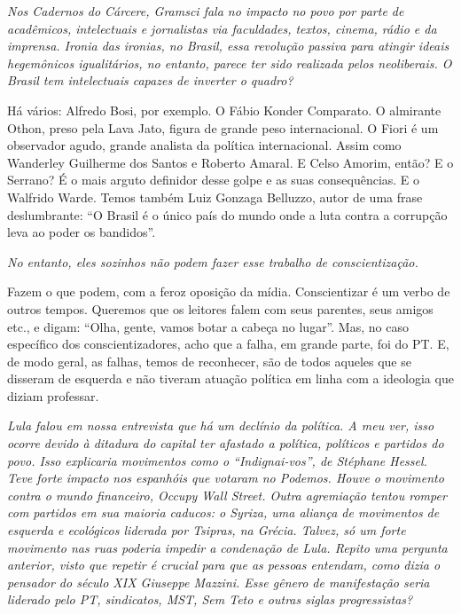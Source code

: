\itshape
 Nos \emph{Cadernos do Cárcere}, Gramsci fala no impacto
no povo por parte de acadêmicos, intelectuais e jornalistas via
faculdades, textos, cinema, rádio e da imprensa. Ironia das ironias, no
Brasil, essa revolução passiva para atingir ideais hegemônicos
igualitários, no entanto, parece ter sido realizada pelos neoliberais. O
Brasil tem intelectuais capazes de inverter o quadro?

\normalfont 
Há vários: Alfredo Bosi, por exemplo. O Fábio Konder
Comparato. O almirante Othon, preso pela Lava Jato, figura de grande
peso internacional. O Fiori é um observador agudo, grande analista da
política internacional. Assim como Wanderley Guilherme dos Santos e
Roberto Amaral. E Celso Amorim, então? E o Serrano? É o mais arguto
definidor desse golpe e as suas consequências. E o Walfrido Warde. Temos
também Luiz Gonzaga Belluzzo, autor de uma frase deslumbrante: ``O
Brasil é o único país do mundo onde a luta contra a corrupção leva ao
poder os bandidos''.

\itshape
 No entanto, eles sozinhos não podem fazer esse trabalho
de conscientização.

\normalfont 
Fazem o que podem, com a feroz oposição da mídia.
Conscientizar é um verbo de outros tempos. Queremos que os leitores
falem com seus parentes, seus amigos etc., e digam: ``Olha, gente, vamos
botar a cabeça no lugar''. Mas, no caso específico dos
conscientizadores, acho que a falha, em grande parte, foi do PT. E, de
modo geral, as falhas, temos de reconhecer, são de todos aqueles que se
disseram de esquerda e não tiveram atuação política em linha com a
ideologia que diziam professar.

\itshape
 Lula falou em nossa entrevista que há um declínio da
política. A meu ver, isso ocorre devido à ditadura do capital ter
afastado a política, políticos e partidos do povo. Isso explicaria
movimentos como o ``Indignai-vos'', de Stéphane Hessel. Teve forte
impacto nos espanhóis que votaram no Podemos. Houve o movimento contra o
mundo financeiro, Occupy Wall Street. Outra agremiação tentou romper com
partidos em sua maioria caducos: o Syriza, uma aliança de movimentos de
esquerda e ecológicos liderada por Tsipras, na Grécia. Talvez, só um
forte movimento nas ruas poderia impedir a condenação de Lula. Repito
uma pergunta anterior, visto que repetir é crucial para que as pessoas
entendam, como dizia o pensador do século XIX Giuseppe Mazzini. Esse
gênero de manifestação seria liderado pelo PT, sindicatos, MST, Sem Teto
e outras siglas progressistas?

